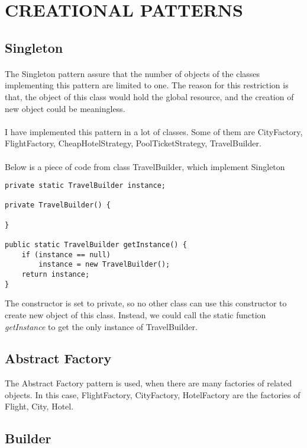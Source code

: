 \section{CREATIONAL PATTERNS}
\subsection{Singleton}

\paragraph{}
The Singleton pattern assure that the number of objects of the classes implementing this pattern are limited to one. The reason for this restriction is that, the object of this class would hold the global resource, and the creation of new object could be meaningless.

\paragraph{}
I have implemented this pattern in a lot of classes. Some of them are CityFactory, FlightFactory, CheapHotelStrategy, PoolTicketStrategy, TravelBuilder.

\paragraph{}
Below is a piece of code from class TravelBuilder, which implement Singleton

\begin{lstlisting}
private static TravelBuilder instance;

private TravelBuilder() {

}

public static TravelBuilder getInstance() {
	if (instance == null)
		instance = new TravelBuilder();
	return instance;
}
\end{lstlisting}

The constructor is set to private, so no other class can use this constructor to create new object of this class. Instead, we could call the static function \textit{getInstance} to get the only instance of TravelBuilder.

\subsection{Abstract Factory}
The Abstract Factory pattern is used, when there are many factories of related objects. In this case, FlightFactory, CityFactory, HotelFactory are the factories of Flight, City, Hotel. 



\subsection{Builder}